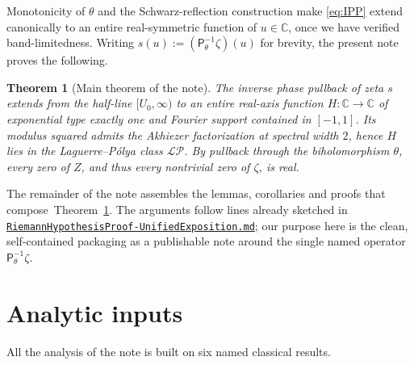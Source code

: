 \documentclass[11pt,a4paper]{article}
\newtheorem{theorem}{Theorem}[section]
\theoremstyle{definition}
\newcommand{\ipp}{\mathsf{P}_\theta^{-1}}
\newcommand{\C}{\mathbb{C}}
\newcommand{\LP}{\mathcal{LP}}
\begin{document}
Monotonicity of $\theta$ and the Schwarz-reflection construction make
\eqref{eq:IPP} extend canonically to an entire real-symmetric function of $u\in\C$,
once we have verified band-limitedness. Writing
$s(u) := (\ipp\zeta)(u)$ for brevity, the present note proves the following.

\begin{theorem}[Main theorem of the note]\label{thm:main}
The inverse phase pullback of zeta $s$ extends from the half-line
$[U_0,\infty)$ to an entire real-axis function $H\colon\C\to\C$ of exponential type
exactly one and Fourier support contained in $[-1,1]$. Its modulus squared admits
the Akhiezer factorization at spectral width $2$, hence $H$ lies in the
Laguerre--P\'olya class $\LP$. By pullback through the biholomorphism $\theta$,
every zero of $Z$, and thus every nontrivial zero of $\zeta$, is real.
\end{theorem}

The remainder of the note assembles the lemmas, corollaries and proofs that
compose~Theorem~\ref{thm:main}. The arguments follow lines already sketched in
\href{https://github.com/crowlogic/arb4j/blob/master/docs/RiemannHypothesisProof-UnifiedExposition.md}%
{\texttt{RiemannHypothesisProof-UnifiedExposition.md}};
our purpose here is the clean, self-contained packaging as a publishable note
around the single named operator $\ipp\zeta$.

\section{Analytic inputs}
\label{sec:inputs}

All the analysis of the note is built on six named classical results.
\end{document}
